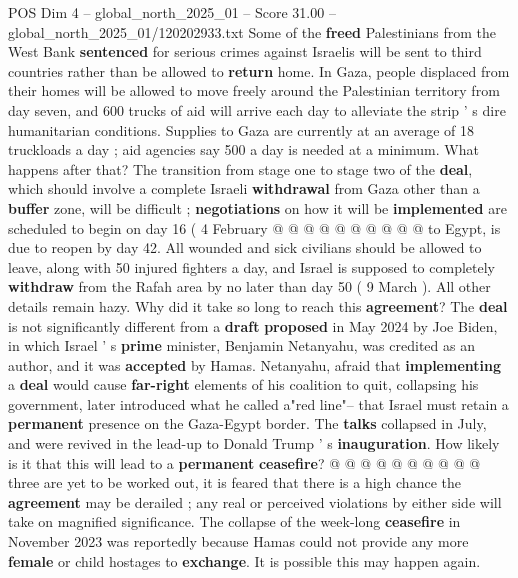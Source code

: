 \begin{textsample}{POS Dim 4 – global\_north\_2025\_01 – Score 31.00 – global\_north\_2025\_01/120202933.txt}
Some of the \textbf{freed} Palestinians from the West Bank \textbf{sentenced} for serious crimes against Israelis will be sent to third countries rather than be allowed to \textbf{return} home.
In Gaza, people displaced from their homes will be allowed to move freely around the Palestinian territory from day seven, and 600 trucks of aid will arrive each day to alleviate the strip ' s dire humanitarian conditions.
Supplies to Gaza are currently at an average of 18 truckloads a day ; aid agencies say 500 a day is needed at a minimum.
What happens after that?
The transition from stage one to stage two of the \textbf{deal}, which should involve a complete Israeli \textbf{withdrawal} from Gaza other than a \textbf{buffer} zone, will be difficult ; \textbf{negotiations} on how it will be \textbf{implemented} are scheduled to begin on day 16 ( 4 February @ @ @ @ @ @ @ @ @ @ to Egypt, is due to reopen by day 42.
All wounded and sick civilians should be allowed to leave, along with 50 injured fighters a day, and Israel is supposed to completely \textbf{withdraw} from the Rafah area by no later than day 50 ( 9 March ).
All other details remain hazy.
Why did it take so long to reach this \textbf{agreement}?
The \textbf{deal} is not significantly different from a \textbf{draft} \textbf{proposed} in May 2024 by Joe Biden, in which Israel ' s \textbf{prime} minister, Benjamin Netanyahu, was credited as an author, and it was \textbf{accepted} by Hamas.
Netanyahu, afraid that \textbf{implementing} a \textbf{deal} would cause \textbf{far-right} elements of his coalition to quit, collapsing his government, later introduced what he called a"red line"-- that Israel must retain a \textbf{permanent} presence on the Gaza-Egypt border.
The \textbf{talks} collapsed in July, and were revived in the lead-up to Donald Trump ' s \textbf{inauguration}.
How likely is it that this will lead to a \textbf{permanent} \textbf{ceasefire}? @ @ @ @ @ @ @ @ @ @ three are yet to be worked out, it is feared that there is a high chance the \textbf{agreement} may be derailed ; any real or perceived violations by either side will take on magnified significance.
The collapse of the week-long \textbf{ceasefire} in November 2023 was reportedly because Hamas could not provide any more \textbf{female} or child hostages to \textbf{exchange}.
It is possible this may happen again.

\end{textsample}
